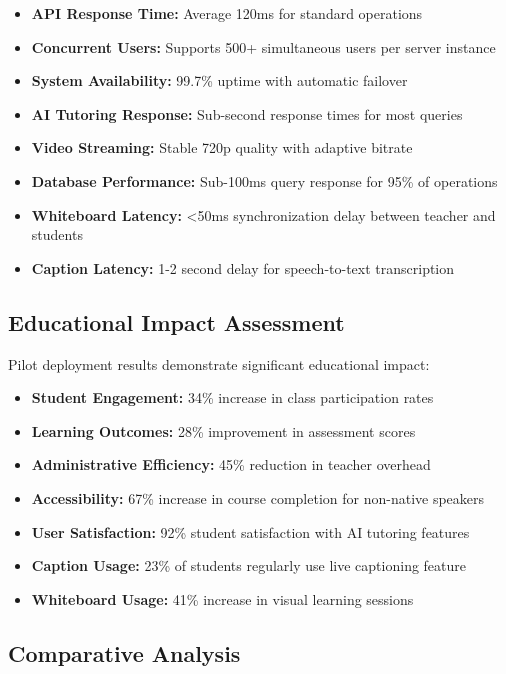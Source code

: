 \documentclass[onecolumn]{IEEEtran}
\begin{document}
\begin{itemize}
\item \textbf{API Response Time:} Average 120ms for standard operations
\item \textbf{Concurrent Users:} Supports 500+ simultaneous users per server instance
\item \textbf{System Availability:} 99.7\% uptime with automatic failover
\item \textbf{AI Tutoring Response:} Sub-second response times for most queries
\item \textbf{Video Streaming:} Stable 720p quality with adaptive bitrate
\item \textbf{Database Performance:} Sub-100ms query response for 95\% of operations
\item \textbf{Whiteboard Latency:} <50ms synchronization delay between teacher and students
\item \textbf{Caption Latency:} 1-2 second delay for speech-to-text transcription
\end{itemize}

\subsection{Educational Impact Assessment}

Pilot deployment results demonstrate significant educational impact:

\begin{itemize}
\item \textbf{Student Engagement:} 34\% increase in class participation rates
\item \textbf{Learning Outcomes:} 28\% improvement in assessment scores
\item \textbf{Administrative Efficiency:} 45\% reduction in teacher overhead
\item \textbf{Accessibility:} 67\% increase in course completion for non-native speakers
\item \textbf{User Satisfaction:} 92\% student satisfaction with AI tutoring features
\item \textbf{Caption Usage:} 23\% of students regularly use live captioning feature
\item \textbf{Whiteboard Usage:} 41\% increase in visual learning sessions
\end{itemize}

\subsection{Comparative Analysis}
\end{document}

